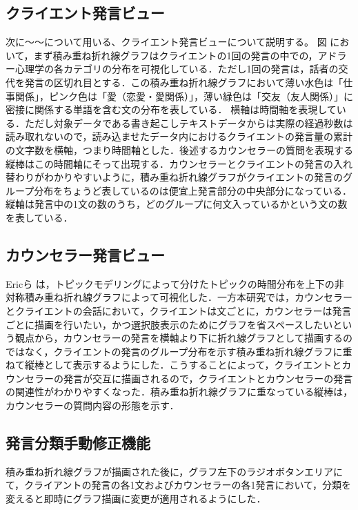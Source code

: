 \documentclass[shuuron]{kuee}
\begin{document}
\subsection{クライエント発言ビュー}
次に〜〜について用いる、クライエント発言ビューについて説明する。
図
において，まず積み重ね折れ線グラフはクライエントの1回の発言の中での，アドラー心理学の各カテゴリの分布を可視化している．ただし1回の発言は，話者の交代を発言の区切れ目とする．この積み重ね折れ線グラフにおいて薄い水色は「仕事関係」，ピンク色は「愛（恋愛・愛関係）」，薄い緑色は「交友（友人関係）」に密接に関係する単語を含む文の分布を表している．
横軸は時間軸を表現している．ただし対象データである書き起こしテキストデータからは実際の経過秒数は読み取れないので，読み込ませたデータ内におけるクライエントの発言量の累計の文字数を横軸，つまり時間軸とした．後述するカウンセラーの質問を表現する縦棒はこの時間軸にそって出現する．カウンセラーとクライエントの発言の入れ替わりがわかりやすいように，積み重ね折れ線グラフがクライエントの発言のグループ分布をちょうど表しているのは便宜上発言部分の中央部分になっている．
縦軸は発言中の1文の数のうち，どのグループに何文入っているかという文の数を表している．





\subsection{カウンセラー発言ビュー}

Ericら
は，トピックモデリングによって分けたトピックの時間分布を上下の非対称積み重ね折れ線グラフによって可視化した．一方本研究では，カウンセラーとクライエントの会話において，クライエントは文ごとに，カウンセラーは発言ごとに描画を行いたい，かつ選択肢表示のためにグラフを省スペースしたいという観点から，カウンセラーの発言を横軸より下に折れ線グラフとして描画するのではなく，クライエントの発言のグループ分布を示す積み重ね折れ線グラフに重ねて縦棒として表示するようにした．こうすることによって，クライエントとカウンセラーの発言が交互に描画されるので，クライエントとカウンセラーの発言の関連性がわかりやすくなった．積み重ね折れ線グラフに重なっている縦棒は，カウンセラーの質問内容の形態を示す．


\subsection{発言分類手動修正機能}
積み重ね折れ線グラフが描画された後に，グラフ左下のラジオボタンエリアにて，クライアントの発言の各1文およびカウンセラーの各1発言において，分類を変えると即時にグラフ描画に変更が適用されるようにした．
\end{document}
